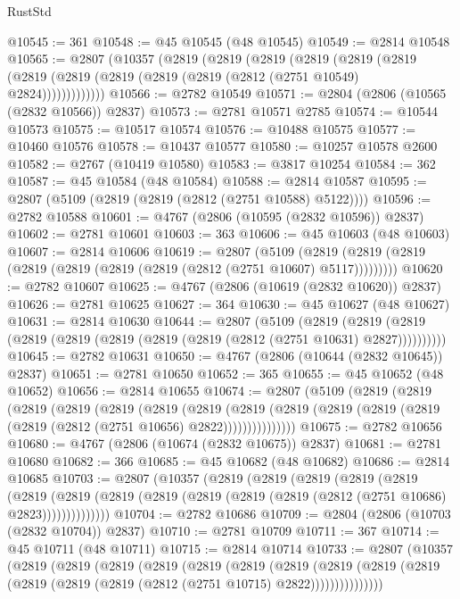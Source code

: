 \begin{lexlean}{RustStd}
\begin{coremodule}
@10545 := 361
@10548 := @45 @10545 (@48 @10545)
@10549 := @2814 @10548
@10565 := @2807
    (@10357
      (@2819
        (@2819
          (@2819
            (@2819
              (@2819
                (@2819 (@2819 (@2819 (@2819 (@2819 (@2819 (@2812 (@2751 @10549) @2824)))))))))))))
@10566 := @2782 @10549
@10571 := @2804 (@2806 (@10565 (@2832 @10566)) @2837)
@10573 := @2781 @10571 @2785
@10574 := @10544 @10573
@10575 := @10517 @10574
@10576 := @10488 @10575
@10577 := @10460 @10576
@10578 := @10437 @10577
@10580 := @10257 @10578 @2600
@10582 := @2767 (@10419 @10580)
@10583 := @3817 @10254
@10584 := 362
@10587 := @45 @10584 (@48 @10584)
@10588 := @2814 @10587
@10595 := @2807 (@5109 (@2819 (@2819 (@2812 (@2751 @10588) @5122))))
@10596 := @2782 @10588
@10601 := @4767 (@2806 (@10595 (@2832 @10596)) @2837)
@10602 := @2781 @10601
@10603 := 363
@10606 := @45 @10603 (@48 @10603)
@10607 := @2814 @10606
@10619 := @2807
    (@5109 (@2819 (@2819 (@2819 (@2819 (@2819 (@2819 (@2819 (@2812 (@2751 @10607) @5117)))))))))
@10620 := @2782 @10607
@10625 := @4767 (@2806 (@10619 (@2832 @10620)) @2837)
@10626 := @2781 @10625
@10627 := 364
@10630 := @45 @10627 (@48 @10627)
@10631 := @2814 @10630
@10644 := @2807
    (@5109
      (@2819 (@2819 (@2819 (@2819 (@2819 (@2819 (@2819 (@2819 (@2812 (@2751 @10631) @2827))))))))))
@10645 := @2782 @10631
@10650 := @4767 (@2806 (@10644 (@2832 @10645)) @2837)
@10651 := @2781 @10650
@10652 := 365
@10655 := @45 @10652 (@48 @10652)
@10656 := @2814 @10655
@10674 := @2807
    (@5109
      (@2819
        (@2819
          (@2819
            (@2819
              (@2819
                (@2819
                  (@2819
                    (@2819
                      (@2819 (@2819 (@2819 (@2819 (@2819 (@2812 (@2751 @10656) @2822)))))))))))))))
@10675 := @2782 @10656
@10680 := @4767 (@2806 (@10674 (@2832 @10675)) @2837)
@10681 := @2781 @10680
@10682 := 366
@10685 := @45 @10682 (@48 @10682)
@10686 := @2814 @10685
@10703 := @2807
    (@10357
      (@2819
        (@2819
          (@2819
            (@2819
              (@2819
                (@2819
                  (@2819
                    (@2819 (@2819 (@2819 (@2819 (@2819 (@2812 (@2751 @10686) @2823))))))))))))))
@10704 := @2782 @10686
@10709 := @2804 (@2806 (@10703 (@2832 @10704)) @2837)
@10710 := @2781 @10709
@10711 := 367
@10714 := @45 @10711 (@48 @10711)
@10715 := @2814 @10714
@10733 := @2807
    (@10357
      (@2819
        (@2819
          (@2819
            (@2819
              (@2819
                (@2819
                  (@2819
                    (@2819
                      (@2819 (@2819 (@2819 (@2819 (@2819 (@2812 (@2751 @10715) @2822)))))))))))))))

\end{coremodule}
\end{lexlean}
